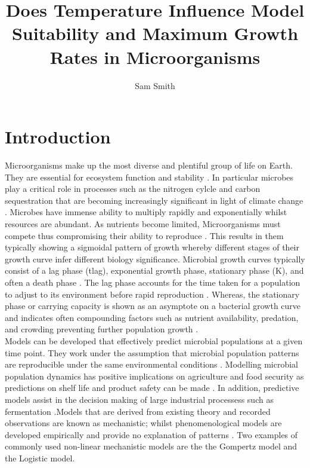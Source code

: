 \documentclass[11pt]{article}
\title{\vspace{+0cm}Does Temperature Influence Model Suitability and Maximum Growth Rates in Microorganisms}
\author{Sam Smith}
\date{}
\begin{document}
  \maketitle
    
  \begin{abstract}
    
  \end{abstract}
  
  \section{Introduction}

Microorganisms make up the most diverse and plentiful group of life on Earth. They are essential for ecosystem function and stability \cite{Shoemaker2021}. In particular microbes play a critical role in processes such as the nitrogen cylcle and carbon sequestration that are becoming increasingly significant in light of climate change \cite{Gupta2016}. Microbes have immense ability to multiply rapidly and exponentially whilst resources are abundant. As nutrients become limited, Microorganisms must compete thus compromising their ability to reproduce \cite{NatRevMicro}. This results in them typically showing a sigmoidal pattern of growth whereby different stages of their growth curve infer different biology significance. Microbial growth curves typically consist of a lag phase (tlag), exponential growth phase, stationary phase (K), and often a death phase \cite{Zwietering1990}. The lag phase accounts for the time taken for a population to adjust to its environment before rapid reproduction \cite{BUCHANAN1997313}. Whereas, the stationary phase or carrying capacity is shown as an asymptote on a bacterial growth curve and indicates often compounding factors such as nutrient availability, predation, and crowding preventing further population growth \cite{WACHENHEIM2003157}.\\
     
Models can be developed that effectively predict microbial populations at a given time point. They work under the assumption that microbial population patterns are reproducible under the same environmental conditions \cite{Pla2015}. Modelling microbial population dynamics has positive implications on agriculture and food security as predictions on shelf life and product safety can be made \cite{Zwietering1990}. In addition, predictive models assist in the decision making of large industrial processess such as fermentation \cite{Garcia2021}.Models that are derived from existing theory and recorded observations are known as mechanistic; whilst phenomenological models are developed empirically and provide no explanation of patterns \cite{doi:10.1080/10408398.2011.570463}. Two examples of commonly used non-linear mechanistic models are the the Gompertz model and the Logistic model.\\
\end{document}
